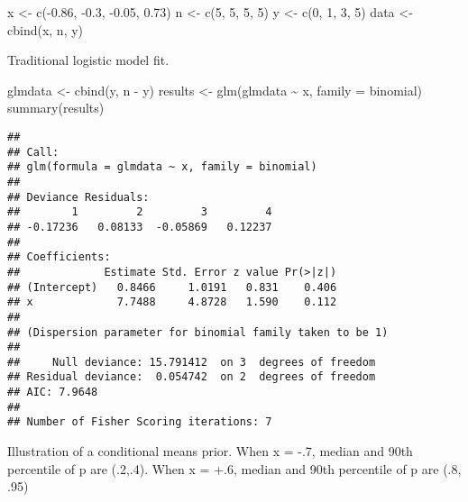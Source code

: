 \documentclass[
]{book}
\newenvironment{Shaded}{\begin{snugshade}}{\end{snugshade}}
\newcommand{\AttributeTok}[1]{\textcolor[rgb]{0.77,0.63,0.00}{#1}}
\newcommand{\DecValTok}[1]{\textcolor[rgb]{0.00,0.00,0.81}{#1}}
\newcommand{\FloatTok}[1]{\textcolor[rgb]{0.00,0.00,0.81}{#1}}
\newcommand{\FunctionTok}[1]{\textcolor[rgb]{0.00,0.00,0.00}{#1}}
\newcommand{\NormalTok}[1]{#1}
\newcommand{\OtherTok}[1]{\textcolor[rgb]{0.56,0.35,0.01}{#1}}
\newcommand{\SpecialCharTok}[1]{\textcolor[rgb]{0.00,0.00,0.00}{#1}}
\begin{document}
\begin{Shaded}
\begin{Highlighting}[]
\NormalTok{x }\OtherTok{\textless{}{-}} \FunctionTok{c}\NormalTok{(}\SpecialCharTok{{-}}\FloatTok{0.86}\NormalTok{, }\SpecialCharTok{{-}}\FloatTok{0.3}\NormalTok{, }\SpecialCharTok{{-}}\FloatTok{0.05}\NormalTok{, }\FloatTok{0.73}\NormalTok{)}
\NormalTok{n }\OtherTok{\textless{}{-}} \FunctionTok{c}\NormalTok{(}\DecValTok{5}\NormalTok{, }\DecValTok{5}\NormalTok{, }\DecValTok{5}\NormalTok{, }\DecValTok{5}\NormalTok{)}
\NormalTok{y }\OtherTok{\textless{}{-}} \FunctionTok{c}\NormalTok{(}\DecValTok{0}\NormalTok{, }\DecValTok{1}\NormalTok{, }\DecValTok{3}\NormalTok{, }\DecValTok{5}\NormalTok{)}
\NormalTok{data }\OtherTok{\textless{}{-}} \FunctionTok{cbind}\NormalTok{(x, n, y)}
\end{Highlighting}
\end{Shaded}

Traditional logistic model fit.

\begin{Shaded}
\begin{Highlighting}[]
\NormalTok{glmdata }\OtherTok{\textless{}{-}} \FunctionTok{cbind}\NormalTok{(y, n }\SpecialCharTok{{-}}\NormalTok{ y)}
\NormalTok{results }\OtherTok{\textless{}{-}} \FunctionTok{glm}\NormalTok{(glmdata }\SpecialCharTok{\textasciitilde{}}\NormalTok{ x, }\AttributeTok{family =}\NormalTok{ binomial)}
\FunctionTok{summary}\NormalTok{(results)}
\end{Highlighting}
\end{Shaded}

\begin{verbatim}
## 
## Call:
## glm(formula = glmdata ~ x, family = binomial)
## 
## Deviance Residuals: 
##        1         2         3         4  
## -0.17236   0.08133  -0.05869   0.12237  
## 
## Coefficients:
##             Estimate Std. Error z value Pr(>|z|)
## (Intercept)   0.8466     1.0191   0.831    0.406
## x             7.7488     4.8728   1.590    0.112
## 
## (Dispersion parameter for binomial family taken to be 1)
## 
##     Null deviance: 15.791412  on 3  degrees of freedom
## Residual deviance:  0.054742  on 2  degrees of freedom
## AIC: 7.9648
## 
## Number of Fisher Scoring iterations: 7
\end{verbatim}

Illustration of a conditional means prior. When x = -.7, median and 90th percentile of p are (.2,.4). When x = +.6, median and 90th percentile of p are (.8, .95)
\end{document}
